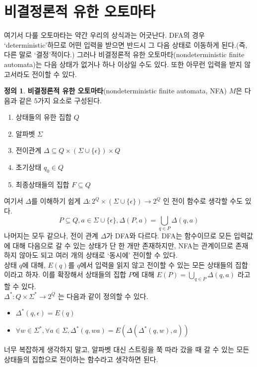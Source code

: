 \documentclass[b5paper]{book}
\theoremstyle{definition}
\newtheorem{defn}{정의}[chapter]
\begin{document}
\section{비결정론적 유한 오토마타}
여기서 다룰 오토마타는 약간 우리의 상식과는 어긋난다. 
DFA의 경우 `deterministic'하므로 어떤 입력을 받으면 반드시 그 다음 상태로 이동하게 된다.(즉,
다른 말로 `결정'적이다.) 그러나 비결정론적 유한 오토마타(nondeterministic 
finite automata)는 다음 상태가 없거나
하나 이상일 수도 있다. 또한 아무런 입력을 받지 않고서라도 전이할 수 있다.
\begin{defn}\textbf{비결정론적 유한 오토마타}(nondeterministic finite
automata, NFA) $M$은 다음과 같은 5가지 요소로 구성된다.
\begin{enumerate}
    \item 상태들의 유한 집합 $Q$
    \item 알파벳 $\Sigma$
    \item 전이관계 $\Delta \subseteq Q \times (\Sigma \cup \{\epsilon\}) \times Q$
    \item 초기상태 $q_0 \in Q$
    \item 최종상태들의 집합 $F \subseteq Q$
\end{enumerate}
\end{defn}
여기서 $\Delta$를 이해하기 쉽게 $\Delta: 2^Q 
\times (\Sigma \cup \{\epsilon\}) \rightarrow 2^{Q}$ 인 전이 함수로 생각할 수도 있다.
$$P \subseteq Q, a\in \Sigma \cup \{\epsilon\}, \Delta(P, a) = \bigcup_{q\in P}
\Delta (q, a) $$
나머지는 모두 같으나, 전이 관계 $\Delta$가 DFA와 다르다. DFA는 함수이므로
모든 입력값에 대해 다음으로 갈 수 있는 상태가 단 한 개만 존재하지만, NFA는 관계이므로
존재하지 않아도 되고 여러 개의 상태로 `동시에' 전이할 수 있다.\\
상태 $q$에 대해, $E(q)$를 $q$에서 입력을 읽지 않고 전이할 수 있는 모든 상태들의
집합이라고 하자. 이를 확장해서 상태들의 집합 $P$에 대해 $E(P) = \bigcup_{q\in P} 
\Delta(q, a)$ 라고 할 수 있다. \\
$\Delta^*: Q \times \Sigma^* \rightarrow 2^{Q} $ 는 다음과 같이 정의할 수 있다. 
\begin{itemize}
    \item $\Delta^* (q, \epsilon) = E(q)$
    \item $\forall w \in \Sigma^* ,  \forall a \in \Sigma,
    \Delta^* (q, wa) = E(\Delta(\Delta^*(q, w), a))$
\end{itemize}
너무 복잡하게 생각하지 말고, 알파벳 대신 
스트링을 쭉 따라 갔을 때 갈 수 있는 모든 상태들의 집합으로 전이하는 함수라고 생각하면 된다.\\
\end{document}
